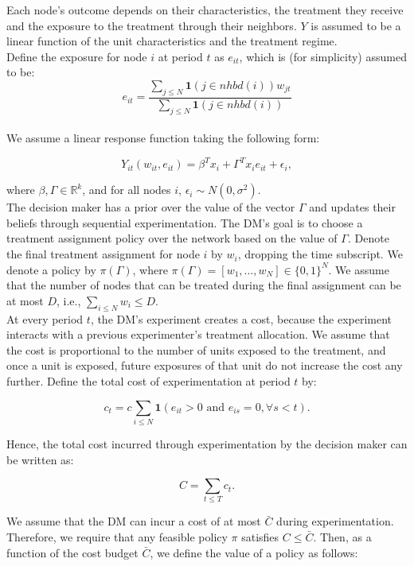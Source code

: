 \documentclass[12pt,a4paper]{article}
\begin{document}
Each node's outcome depends on their characteristics, the treatment they receive and the exposure to the treatment through their neighbors. $Y$ is assumed to be a linear function of the unit characteristics and the treatment regime. \\

Define the exposure for node $i$ at period $t$ as $e_{it}$, which is (for simplicity) assumed to be: 
$$e_{it} = \frac { \sum_{j \leq N}  \mathbf{1}(j \in nhbd(i)) w_{jt}}{ \sum_{j \leq N} \mathbf{1}(j \in nhbd(i)) }$$\\

We assume a linear response function taking the following form:

$$Y_{it}( w_{it}, e_{it}) = \beta^T x_i + \Gamma^T x_i e_{it} + \epsilon_i,$$

where $\beta, \Gamma \in \mathbb{R}^k$, and for all nodes $i$, $\epsilon_i \sim N(0, \sigma^2)$.\\

The decision maker has a prior over the value of the vector $\Gamma$ and updates their beliefs through sequential experimentation. The DM's goal is to choose a treatment assignment policy over the network based on the value of $\Gamma$. Denote the final treatment assignment for node $i$ by $w_i$, dropping the time subscript. We denote a policy by $\pi(\Gamma)$, where $\pi(\Gamma)=[w_1, \dots , w_N] \in \{0,1\}^N$. We assume that the number of nodes that can be treated during the final assignment can be at most $D$, i.e., $\sum_{i \leq N} w_i \leq D$. \\

At every period $t$, the DM's experiment creates a cost, because the experiment interacts with a previous experimenter's treatment allocation. We assume that the cost is proportional to the number of units exposed to the treatment, and once a unit is exposed, future exposures of that unit do not increase the cost any further. Define the total cost of experimentation at period $t$ by:

$$c_t = c \sum_{i \leq N} \mathbf{1}\left( e_{it} > 0 \mbox{ and } e_{is}=0,  \forall s<t \right) .$$

Hence, the total cost incurred through experimentation by the decision maker can be written as:

$$ C= \sum_{t \leq T} c_t  .$$

We assume that the DM can incur a cost of at most $\bar{C}$ during experimentation. Therefore, we require that any feasible policy $\pi$ satisfies $C \leq \bar{C} $. Then, as a function of the cost budget $\bar{C}$, we define the value of a policy as follows:
\end{document}
